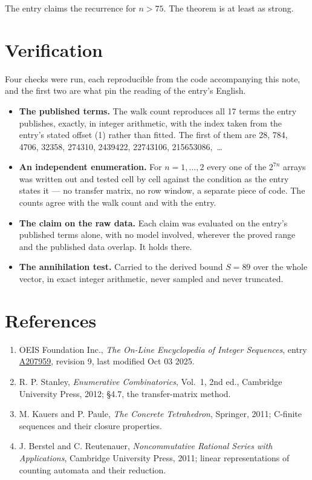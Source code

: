 \documentclass[11pt]{article}
\theoremstyle{definition}
\begin{document}
The entry claims the recurrence for $n > 75$. The theorem is at least as strong.

\section{Verification}

Four checks were run, each reproducible from the code accompanying this note, and the first two are what pin the reading of the entry's English.

\begin{itemize}

\item {\bfseries The published terms.} The walk count reproduces all 17 terms the entry publishes, exactly, in integer arithmetic, with the index taken from the entry's stated offset (1) rather than fitted. The first of them are 28, 784, 4706, 32358, 274310, 2439422, 22743106, 215653086,~\dots

\item {\bfseries An independent enumeration.} For $n = 1,\dots,2$ every one of the $2^{7n}$ arrays was written out and tested cell by cell against the condition as the entry states it --- no transfer matrix, no row window, a separate piece of code. The counts agree with the walk count and with the entry.

\item {\bfseries The claim on the raw data.} Each claim was evaluated on the entry's published terms alone, with no model involved, wherever the proved range and the published data overlap. It holds there.

\item {\bfseries The annihilation test.} Carried to the derived bound $S = 89$ over the whole vector, in exact integer arithmetic, never sampled and never truncated.

\end{itemize}

\section{References}

\begin{enumerate}

\item OEIS Foundation Inc., \emph{The On-Line Encyclopedia of Integer Sequences}, entry \href{https://oeis.org/A207959}{A207959}, revision 9, last modified Oct 03 2025.

\item R. P. Stanley, \emph{Enumerative Combinatorics}, Vol.~1, 2nd ed., Cambridge University Press, 2012; \S4.7, the transfer-matrix method.

\item M. Kauers and P. Paule, \emph{The Concrete Tetrahedron}, Springer, 2011; C-finite sequences and their closure properties.

\item J. Berstel and C. Reutenauer, \emph{Noncommutative Rational Series with Applications}, Cambridge University Press, 2011; linear representations of counting automata and their reduction.

\end{enumerate}
\end{document}
